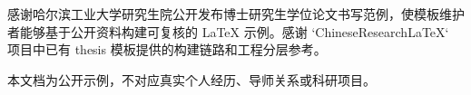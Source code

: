 感谢哈尔滨工业大学研究生院公开发布博士研究生学位论文书写范例，使模板维护者能够基于公开资料构建可复核的 LaTeX 示例。感谢 `ChineseResearchLaTeX` 项目中已有 thesis 模板提供的构建链路和工程分层参考。

本文档为公开示例，不对应真实个人经历、导师关系或科研项目。
